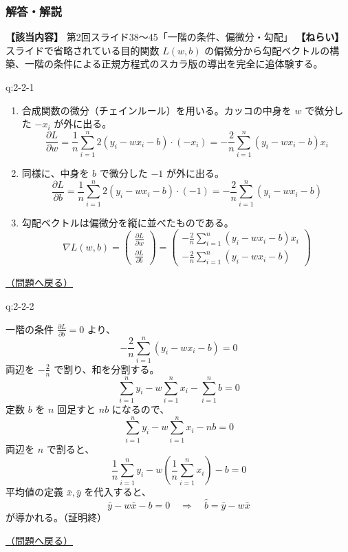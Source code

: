 \subsubsection{解答・解説}\label{ux89e3ux7b54ux89e3ux8aac-4}

\textbf{【該当内容】} 第2回スライド38〜45「一階の条件、偏微分・勾配」
\textbf{【ねらい】} スライドで省略されている目的関数 \(L(w,b)\)
の偏微分から勾配ベクトルの構築、一階の条件による正規方程式のスカラ版の導出を完全に追体験する。

\begin{answerbox}[phantomlabel=a:2-2-1]{q:2-2-1}

\begin{enumerate}
\def\labelenumi{\arabic{enumi}.}
\tightlist
\item
  合成関数の微分（チェインルール）を用いる。カッコの中身を \(w\)
  で微分した \(-x_i\) が外に出る。 \[
       \frac{\partial L}{\partial w} = \frac{1}{n} \sum_{i=1}^n 2(y_i - wx_i - b) \cdot (-x_i) = -\frac{2}{n} \sum_{i=1}^n (y_i - wx_i - b)x_i
       \]
\item
  同様に、中身を \(b\) で微分した \(-1\) が外に出る。 \[
       \frac{\partial L}{\partial b} = \frac{1}{n} \sum_{i=1}^n 2(y_i - wx_i - b) \cdot (-1) = -\frac{2}{n} \sum_{i=1}^n (y_i - wx_i - b)
       \]
\item
  勾配ベクトルは偏微分を縦に並べたものである。 \[
       \nabla L(w,b) = \begin{pmatrix} \frac{\partial L}{\partial w} \\ \frac{\partial L}{\partial b} \end{pmatrix} = \begin{pmatrix} -\frac{2}{n} \sum_{i=1}^n (y_i - wx_i - b)x_i \\ -\frac{2}{n} \sum_{i=1}^n (y_i - wx_i - b) \end{pmatrix}
       \]
\end{enumerate}

\hfill 

\hyperref[q:2-2-1]{（問題へ戻る）}

\end{answerbox}

\begin{answerbox}[phantomlabel=a:2-2-2]{q:2-2-2}

一階の条件 \(\frac{\partial L}{\partial b} = 0\) より、 \[
-\frac{2}{n} \sum_{i=1}^n (y_i - wx_i - b) = 0
\] 両辺を \(-\frac{2}{n}\) で割り、和を分割する。 \[
\sum_{i=1}^n y_i - w \sum_{i=1}^n x_i - \sum_{i=1}^n b = 0
\] 定数 \(b\) を \(n\) 回足すと \(nb\) になるので、 \[
\sum_{i=1}^n y_i - w \sum_{i=1}^n x_i - nb = 0
\] 両辺を \(n\) で割ると、 \[
\frac{1}{n}\sum_{i=1}^n y_i - w \left( \frac{1}{n}\sum_{i=1}^n x_i \right) - b = 0
\] 平均値の定義 \(\bar{x}, \bar{y}\) を代入すると、 \[
\bar{y} - w\bar{x} - b = 0 \quad \Rightarrow \quad \hat{b} = \bar{y} - w\bar{x}
\] が導かれる。（証明終）

\hfill 

\hyperref[q:2-2-2]{（問題へ戻る）}

\end{answerbox}


